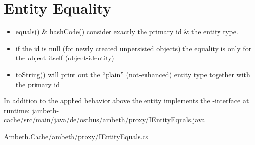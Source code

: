 \section{Entity Equality}
\label{feature:EntityEquals}

\begin{itemize}
	\item equals() \& hashCode() consider exactly the primary id \& the entity type.
	\item if the id is null (for newly created unpersisted objects) the equality is only for the object itself (object-identity)
	\item toString() will print out the ``plain'' (not-enhanced) entity type together with the primary id
\end{itemize}


In addition to the applied behavior above the entity implements the -interface at runtime:
{jambeth-cache/src/main/java/de/osthus/ambeth/proxy/IEntityEquals.java}

{Ambeth.Cache/ambeth/proxy/IEntityEquals.cs}